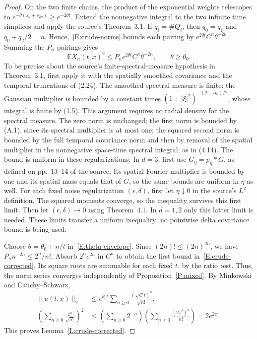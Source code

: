 \documentclass[12pt]{article}
\numberwithin{equation}{section}
\theoremstyle{definition}
\newcommand{\E}{\mathbb{E}}
\begin{document}
\begin{proof}
  On the two finite chains, the product of the exponential weights
  telescopes to $e^{-\theta(s_n+s_{2n})}\ge e^{-2\theta t}$.
  Extend the nonnegative integral to the two infinite time simplices
  and apply the source's Theorem~3.1. If $q_i=\#Q_i$, then
  $q_0=q_1$ and $q_0+q_2/2=n$. Hence,~\eqref{E:crude-norms} bounds
  each pairing by $e^{2\theta t}C^n\theta^{-2n}$.
  Summing the $P_n$ pairings gives
  \begin{equation}\label{E:theta-envelope}
    \E X_n(t,x)^2\le P_n e^{2\theta t}C^n\theta^{-2n},
    \qquad\theta\ge\theta_0.
  \end{equation}
  To be precise about the source's finite-spectral-measure hypothesis in
  Theorem~3.1, first apply it with the spatially smoothed covariance and
  the temporal truncations of (2.24). The smoothed spectral measure is
  finite: the Gaussian multiplier is bounded by a constant times
  $(1+|\xi|^2)^{-(2-\alpha_0)/2}$, whose integral is finite by (1.5).
  This argument requires no radial density for the spectral measure.
  The zero norm is unchanged; the
  first norm is bounded by (A.1), since its spectral multiplier is at
  most one; the squared second norm is bounded by the full temporal
  covariance norm and then by removal of the spatial multiplier in the
  nonnegative space-time spectral integral, as in (4.14). The bound is
  uniform in these regularizations. In $d=3$, first use
  $G_\eta=p_\eta*G$, as defined on pp.~13--14 of the source. Its
  spatial Fourier multiplier is bounded by one and its spatial mass
  equals that of $G$, so the same bounds are uniform in $\eta$ as well.
  For each fixed noise regularization $(\epsilon,\delta)$, first let
  $\eta\downarrow0$ in the source's $L^2$ definition. The squared
  moments converge, so the inequality survives this first limit.
  Then let $(\epsilon,\delta)\to0$ using Theorem~4.1. In $d=1,2$ only
  this latter limit is needed. These limits transfer a uniform inequality;
  no pointwise delta covariance bound is being used.

  Choose $\theta=\theta_0+n/t$ in~\eqref{E:theta-envelope}. Since
  $(2n)!\le(2n)^{2n}$, we have $P_n n^{-2n}\le2^n/n!$.
  Absorb $2^ne^{2n}$ in $C^n$ to obtain the first bound
  in~\eqref{E:crude-corrected}. Its square roots are summable for each
  fixed $t$, by the ratio test. Thus, the norm series converges independently
  of Proposition~\ref{P:mixed}. By Minkowski and Cauchy--Schwarz,
  \[
    \begin{split}
      \|u(t,x)\|_2
      &\le e^{\theta_0t}\sum_{n\ge0}\frac{(\sqrt C t)^n}{\sqrt{n!}},\\
      \left(\sum_{n\ge0}\frac{z^n}{\sqrt{n!}}\right)^2
      &\le\left(\sum_{n\ge0}2^{-n}\right)
      \left(\sum_{n\ge0}\frac{(2z^2)^n}{n!}\right)
      =2e^{2z^2}.
    \end{split}
  \]
  This proves Lemma~\ref{L:crude-corrected}.
\end{proof}
\end{document}
